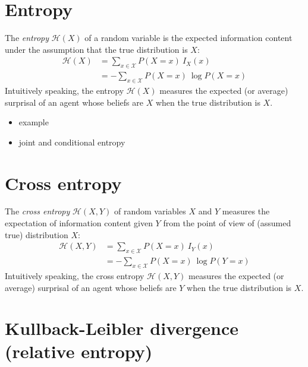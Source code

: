 \documentclass[nobib,nofonts]{tufte-handout}
\begin{document}
\section{Entropy}

The \emph{entropy} $\mathcal{H}(X)$ of a random variable is the expected information content under the assumption that the true distribution is $X$:
\begin{align*}
  \mathcal{H}(X) & = \sum_{x \in \mathcal{X}} P(X = x) \ I_{X}(x) \\
                 & = - \sum_{x \in \mathcal{X}} P(X = x) \ \log P(X = x)
\end{align*}
Intuitively speaking, the entropy $\mathcal{H}(X)$ measures the expected (or average) surprisal of an agent whose beliefs are $X$ when the true distribution is $X$.

\begin{itemize}
  \item example
  \item joint and conditional entropy
\end{itemize}

\section{Cross entropy}

The \emph{cross entropy} $\mathcal{H}(X,Y)$ of random variables $X$ and $Y$ measures the expectation of information content given $Y$ from the point of view of (assumed true) distribution $X$:
\begin{align*}
  \mathcal{H}(X,Y) & = \sum_{x \in \mathcal{X}} P(X = x) \ I_{Y}(x) \\
                   & = - \sum_{x \in \mathcal{X}} P(X = x) \ \log P(Y = x)
\end{align*}
Intuitively speaking, the cross entropy $\mathcal{H}(X,Y)$ measures the expected (or average) surprisal of an agent whose beliefs are $Y$ when the true distribution is $X$.

\section{Kullback-Leibler divergence (relative entropy)}
\end{document}
